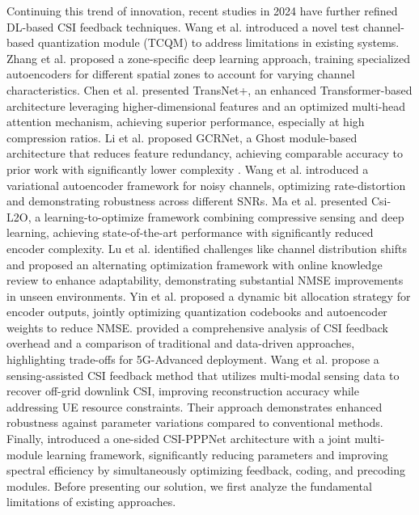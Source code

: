 \documentclass[lettersize,journal]{IEEEtran}
\begin{document}
Continuing this trend of innovation, recent studies in 2024 have further refined DL-based CSI feedback techniques. Wang et al. \cite{wang2024better} introduced a novel test channel-based quantization module (TCQM) to address limitations in existing systems. Zhang et al. \cite{zhang2024zone} proposed a zone-specific deep learning approach, training specialized autoencoders for different spatial zones to account for varying channel characteristics. Chen et al. \cite{chen2024transnet} presented TransNet+, an enhanced Transformer-based architecture leveraging higher-dimensional features and an optimized multi-head attention mechanism, achieving superior performance, especially at high compression ratios. Li et al. \cite{li2024lightweight} proposed GCRNet, a Ghost module-based architecture that reduces feature redundancy, achieving comparable accuracy to prior work with significantly lower complexity \cite{ji2021clnet}. Wang et al. \cite{wang2024variational} introduced a variational autoencoder framework for noisy channels, optimizing rate-distortion and demonstrating robustness across different SNRs. Ma et al. \cite{Ma2024} presented Csi-L2O, a learning-to-optimize framework combining compressive sensing and deep learning, achieving state-of-the-art performance with significantly reduced encoder complexity. Lu et al. \cite{prac2024} identified challenges like channel distribution shifts and proposed an alternating optimization framework with online knowledge review to enhance adaptability, demonstrating substantial NMSE improvements in unseen environments. Yin et al. \cite{quant2024} proposed a dynamic bit allocation strategy for encoder outputs, jointly optimizing quantization codebooks and autoencoder weights to reduce NMSE. \cite{CSICompression2024} provided a comprehensive analysis of CSI feedback overhead and a comparison of traditional and data-driven approaches, highlighting trade-offs for 5G-Advanced deployment.
Wang et al. \cite{sensingfeedback} propose a sensing-assisted CSI feedback method that utilizes multi-modal sensing data to recover off-grid downlink CSI, improving reconstruction accuracy while addressing UE resource constraints. Their approach demonstrates enhanced robustness against parameter variations compared to conventional methods.
Finally, \cite{Guo2024} introduced a one-sided CSI-PPPNet architecture with a joint multi-module learning framework, significantly reducing parameters and improving spectral efficiency by simultaneously optimizing feedback, coding, and precoding modules.
Before presenting our solution, we first analyze the fundamental limitations of existing approaches.
\end{document}
